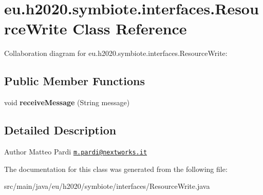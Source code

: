 \hypertarget{classeu_1_1h2020_1_1symbiote_1_1interfaces_1_1ResourceWrite}{}\section{eu.\+h2020.\+symbiote.\+interfaces.\+Resource\+Write Class Reference}
\label{classeu_1_1h2020_1_1symbiote_1_1interfaces_1_1ResourceWrite}


Collaboration diagram for eu.\+h2020.\+symbiote.\+interfaces.\+Resource\+Write\+:
\subsection*{Public Member Functions}
\begin{DoxyCompactItemize}
\item 
\mbox{\label{classeu_1_1h2020_1_1symbiote_1_1interfaces_1_1ResourceWrite_a942baffca5ca48b45fdd7c9e8a24b71c}} 
void {\bfseries receive\+Message} (String message)
\end{DoxyCompactItemize}


\subsection{Detailed Description}
\begin{DoxyAuthor}{Author}
Matteo Pardi \href{mailto:m.pardi@nextworks.it}{\tt m.\+pardi@nextworks.\+it} 
\end{DoxyAuthor}


The documentation for this class was generated from the following file\+:\begin{DoxyCompactItemize}
\item 
src/main/java/eu/h2020/symbiote/interfaces/Resource\+Write.\+java\end{DoxyCompactItemize}
